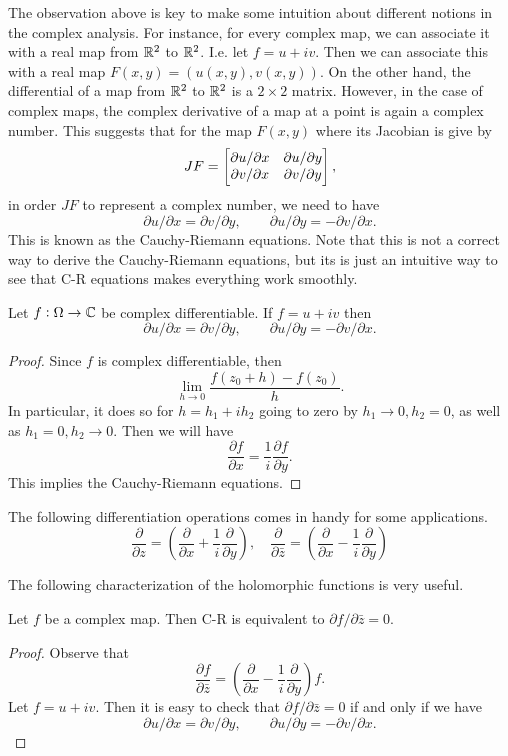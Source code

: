 The observation above is key to make some intuition about different notions in the complex analysis. For instance, for every complex map, we can associate it with a real map from $ \mathbb{R}^2 $ to $ \mathbb{R}^2 $. I.e. let $ f = u + iv $. Then we can associate this with a real map $ F(x,y) = (u(x,y),v(x,y)) $. On the other hand, the differential of a map from $ \mathbb{R}^2 $ to $ \mathbb{R}^2 $ is a $ 2\times 2 $ matrix. However, in the case of complex  maps, the complex derivative of a map at a point is again a complex number. This suggests that for the map $ F(x,y) $ where its Jacobian is give by
\[ JF = \begin{bmatrix} \partial u/\partial x & \partial u/\partial y \\ \partial v/\partial x & \partial v/\partial y \end{bmatrix}, \]
in order $ JF $ to represent a complex number, we need to have
\[ \partial u/\partial x = \partial v/\partial y, \qquad \partial u/\partial y = - \partial v/\partial x. \]
This is known as the Cauchy-Riemann equations. Note that this is not a correct way to derive the Cauchy-Riemann equations, but its is just an intuitive way to see that C-R equations makes everything work smoothly.

\begin{theorem}
	Let $ f: \Omega \to \mathbb{C} $ be complex differentiable. If $ f = u+iv $ then
	\[ \partial u/\partial x = \partial v/\partial y, \qquad \partial u/\partial y = - \partial v/\partial x. \]
\end{theorem}
\begin{proof}
	Since $ f $ is complex differentiable, then 
	\[ \lim_{h\to 0} \frac{f(z_0 + h) - f(z_0)}{h}. \]
	In particular, it does so for $ h=h_1+ih_2 $ going to zero by $ h_1\to 0, h_2=0 $, as well as $ h_1=0, h_2\to 0 $. Then we will have
	\[ \frac{\partial f}{\partial x} = \frac{1}{i}\frac{\partial f}{\partial y}. \]
	This implies the Cauchy-Riemann equations.
\end{proof}

\begin{definition}
	The following differentiation operations comes in handy for some applications.
	\[ \frac{\partial}{\partial z} = (\frac{\partial }{\partial x} + \frac{1}{i} \frac{\partial }{\partial y}), \quad \frac{\partial}{\partial \bar{z}} = (\frac{\partial }{\partial x} - \frac{1}{i} \frac{\partial }{\partial y})\]
\end{definition}

The following characterization of the holomorphic functions is very useful.
\begin{proposition}
	Let $ f $ be a complex map. Then C-R is equivalent to $ \partial f/\partial \bar{z} = 0 $.
\end{proposition}
\begin{proof}
	Observe that
	\[ \frac{\partial f}{\partial \bar{z}} = (\frac{\partial }{\partial x} - \frac{1}{i} \frac{\partial }{\partial y}) f. \]
	Let $ f = u + iv $. Then it is easy to check that $ \partial f/\partial \bar{z} = 0 $ if and only if we have
	\[ \partial u/\partial x = \partial v/\partial y, \qquad \partial u/\partial y = -\partial v/\partial x. \]
\end{proof}


